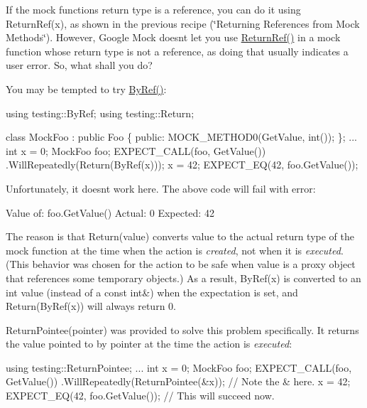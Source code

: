 If the mock function\textquotesingle{}s return type is a reference, you can do it using {\ttfamily Return\+Ref(x)}, as shown in the previous recipe (\char`\"{}\+Returning References
from Mock Methods\char`\"{}). However, Google Mock doesn\textquotesingle{}t let you use {\ttfamily \hyperlink{namespacetesting_a18eda8fe9c89ee856c199a2e04ca1641}{Return\+Ref()}} in a mock function whose return type is not a reference, as doing that usually indicates a user error. So, what shall you do?

You may be tempted to try {\ttfamily \hyperlink{namespacetesting_aaee6d42dcd69de6e7a1459c5c71222c3}{By\+Ref()}}\+:


\begin{DoxyCode}
using testing::ByRef;
using testing::Return;

class MockFoo : public Foo \{
 public:
  MOCK\_METHOD0(GetValue, int());
\};
...
  int x = 0;
  MockFoo foo;
  EXPECT\_CALL(foo, GetValue())
      .WillRepeatedly(Return(ByRef(x)));
  x = 42;
  EXPECT\_EQ(42, foo.GetValue());
\end{DoxyCode}


Unfortunately, it doesn\textquotesingle{}t work here. The above code will fail with error\+:


\begin{DoxyCode}
Value of: foo.GetValue()
  Actual: 0
Expected: 42
\end{DoxyCode}


The reason is that {\ttfamily Return(value)} converts {\ttfamily value} to the actual return type of the mock function at the time when the action is {\itshape created}, not when it is {\itshape executed}. (This behavior was chosen for the action to be safe when {\ttfamily value} is a proxy object that references some temporary objects.) As a result, {\ttfamily By\+Ref(x)} is converted to an {\ttfamily int} value (instead of a {\ttfamily const int\&}) when the expectation is set, and {\ttfamily Return(\+By\+Ref(x))} will always return 0.

{\ttfamily Return\+Pointee(pointer)} was provided to solve this problem specifically. It returns the value pointed to by {\ttfamily pointer} at the time the action is {\itshape executed}\+:


\begin{DoxyCode}
using testing::ReturnPointee;
...
  int x = 0;
  MockFoo foo;
  EXPECT\_CALL(foo, GetValue())
      .WillRepeatedly(ReturnPointee(&x));  // Note the & here.
  x = 42;
  EXPECT\_EQ(42, foo.GetValue());  // This will succeed now.
\end{DoxyCode}


